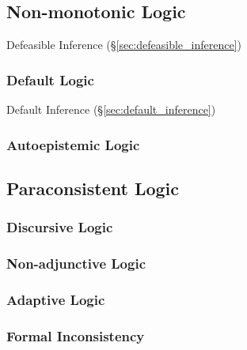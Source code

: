 \subsection{Non-monotonic Logic}\label{sec:nonmonotonic_logic}

Defeasible Inference (\S\ref{sec:defeasible_inference})



\subsubsection{Default Logic}\label{sec:default_logic}

Default Inference (\S\ref{sec:default_inference})



\subsubsection{Autoepistemic Logic}\label{sec:autoepistemic_logic}



\subsection{Paraconsistent Logic}\label{sec:paraconsistent_logic}

\subsubsection{Discursive Logic}\label{sec:discursive_logic}

\subsubsection{Non-adjunctive Logic}\label{sec:nonadjunctive_logic}

\subsubsection{Adaptive Logic}\label{sec:adaptive_logic}

\subsubsection{Formal Inconsistency}\label{sec:formal_inconsistency}


